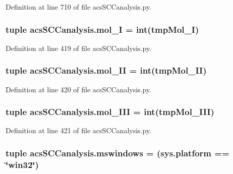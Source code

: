 Definition at line 710 of file acs\+S\+C\+Canalysis.\+py.

\hypertarget{a00130_ae13d6607ffa236891a9af05bfa88cfcc}{
\subsubsection[{mol\+\_\+\+I}]{\setlength{\rightskip}{0pt plus 5cm}tuple acs\+S\+C\+Canalysis.\+mol\+\_\+\+I = int(tmp\+Mol\+\_\+\+I)}}\label{a00130_ae13d6607ffa236891a9af05bfa88cfcc}


Definition at line 419 of file acs\+S\+C\+Canalysis.\+py.

\hypertarget{a00130_a8f2878f5909e4aeb9155a1103eaba413}{
\subsubsection[{mol\+\_\+\+I\+I}]{\setlength{\rightskip}{0pt plus 5cm}tuple acs\+S\+C\+Canalysis.\+mol\+\_\+\+I\+I = int(tmp\+Mol\+\_\+\+I\+I)}}\label{a00130_a8f2878f5909e4aeb9155a1103eaba413}


Definition at line 420 of file acs\+S\+C\+Canalysis.\+py.

\hypertarget{a00130_a20047e8516f386a7e98ffa0efec09471}{
\subsubsection[{mol\+\_\+\+I\+I\+I}]{\setlength{\rightskip}{0pt plus 5cm}tuple acs\+S\+C\+Canalysis.\+mol\+\_\+\+I\+I\+I = int(tmp\+Mol\+\_\+\+I\+I\+I)}}\label{a00130_a20047e8516f386a7e98ffa0efec09471}


Definition at line 421 of file acs\+S\+C\+Canalysis.\+py.

\hypertarget{a00130_a2abf09620dd1dd990036c67c626b3dee}{
\subsubsection[{mswindows}]{\setlength{\rightskip}{0pt plus 5cm}tuple acs\+S\+C\+Canalysis.\+mswindows = (sys.\+platform == \char`\"{}win32\char`\"{})}}\label{a00130_a2abf09620dd1dd990036c67c626b3dee}



